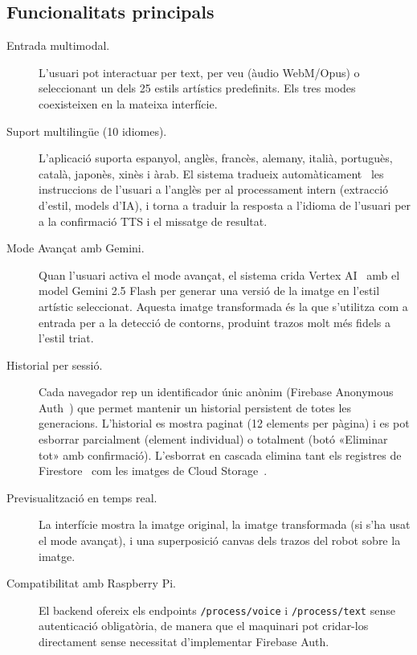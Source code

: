 \subsection{Funcionalitats principals}

\begin{description}
  \item[Entrada multimodal.] L'usuari pot interactuar per text, per veu (àudio WebM/Opus) o seleccionant un dels 25 estils artístics predefinits. Els tres modes coexisteixen en la mateixa interfície.

  \item[Suport multilingüe (10 idiomes).] L'aplicació suporta espanyol, anglès, francès, alemany, italià, portuguès, català, japonès, xinès i àrab. El sistema tradueix automàticament~\cite{translate} les instruccions de l'usuari a l'anglès per al processament intern (extracció d'estil, models d'IA), i torna a traduir la resposta a l'idioma de l'usuari per a la confirmació TTS i el missatge de resultat.

  \item[Mode Avançat amb Gemini.] Quan l'usuari activa el mode avançat, el sistema crida Vertex AI~\cite{vertexai} amb el model Gemini 2.5 Flash per generar una versió de la imatge en l'estil artístic seleccionat. Aquesta imatge transformada és la que s'utilitza com a entrada per a la detecció de contorns, produint trazos molt més fidels a l'estil triat.

  \item[Historial per sessió.] Cada navegador rep un identificador únic anònim (Firebase Anonymous Auth~\cite{firebase}) que permet mantenir un historial persistent de totes les generacions. L'historial es mostra paginat (12 elements per pàgina) i es pot esborrar parcialment (element individual) o totalment (botó «Eliminar tot» amb confirmació). L'esborrat en cascada elimina tant els registres de Firestore~\cite{firestore} com les imatges de Cloud Storage~\cite{gcs}.

  \item[Previsualització en temps real.] La interfície mostra la imatge original, la imatge transformada (si s'ha usat el mode avançat), i una superposició canvas dels trazos del robot sobre la imatge.

  \item[Compatibilitat amb Raspberry Pi.] El backend ofereix els endpoints \texttt{/process/voice} i \texttt{/process/text} sense autenticació obligatòria, de manera que el maquinari pot cridar-los directament sense necessitat d'implementar Firebase Auth.
\end{description}

